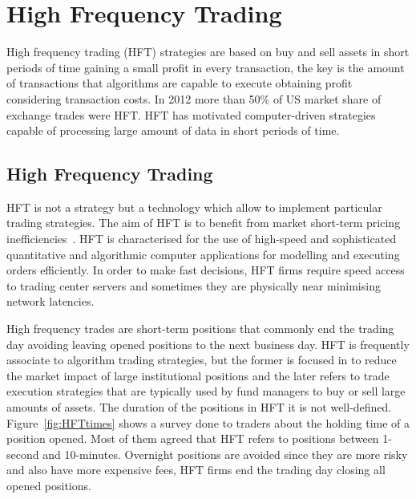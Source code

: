 \chapter{High Frequency Trading}

High frequency trading (HFT) strategies are based on buy and sell assets in
short periods of time gaining a small profit in every transaction, the key is
the amount of transactions that algorithms are capable to execute obtaining profit considering transaction costs. 
In 2012 more than 50\% of US market share of exchange trades were HFT.  HFT has
motivated computer-driven strategies capable of processing large amount of data
in short periods of time. 


\section{High Frequency Trading}

HFT is not a strategy but a technology which allow to implement particular
trading strategies. The aim of HFT is to benefit from market short-term pricing
inefficiencies~\cite{chlistalla2011}. HFT is characterised for the use of
high-speed and sophisticated quantitative and algorithmic computer applications
for modelling and executing orders efficiently. In order to make fast decisions,
HFT firms require speed access to trading center servers and sometimes they are
physically near minimising network latencies.

High frequency trades are short-term positions that commonly end the trading
day avoiding leaving opened positions to the next business day. HFT is
frequently associate to algorithm trading strategies, but the former is focused
in to reduce the market impact of large institutional positions and the later refers to trade execution strategies that are typically used by fund managers to buy or sell large amounts of assets. The duration of the positions in HFT it is not well-defined. Figure~\ref{fig:HFTtimes} shows a survey done to traders about the holding time
of a position opened. Most of them agreed that HFT refers to positions between
1-second and 10-minutes. Overnight positions are avoided since they are more
risky and also have more expensive fees, HFT firms end the trading day closing all
opened positions.

